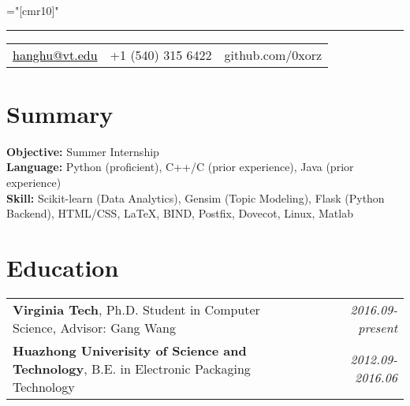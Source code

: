 \documentclass[a4paper,10pt]{article}
\begin{document}
\pagestyle{empty} %

\font\fb="[cmr10]" %
\bigskip

\hrule height 0.7mm \vspace{-0.4em}
\begin{tabular}{p{4.0cm}p{4.0cm}p{4.0cm}}
{\small \href{mailto:hanghu@vt.edu}{\textcolor{black}{hanghu@vt.edu}}}
&{\small +1 (540) 315 6422}
&{\small github.com/0xorz}
   \\
\end{tabular}
\section{Summary}
\begin{flushleft}
\hspace{1em} \textbf{Objective:} Summer Internship \\
\hspace{1em} \textbf{Language:} Python (proficient), C++/C (prior experience), Java (prior experience) \\
\hspace{1em} \textbf{Skill:} Scikit-learn (Data Analytics), Gensim (Topic Modeling), Flask (Python Backend), HTML/CSS, \LaTeX, BIND, Postfix, Dovecot, Linux, Matlab\\
\end{flushleft}

\section{Education}
\begin{tabular}{p{14cm}p{0cm}r}
\textbf{Virginia Tech}, Ph.D. Student in Computer Science, Advisor: Gang Wang && \emph{2016.09-present} \\
\textbf{Huazhong Univerisity of Science and Technology}, B.E. in Electronic Packaging Technology && \emph{2012.09-2016.06} \\
\end{tabular}
\end{document}
